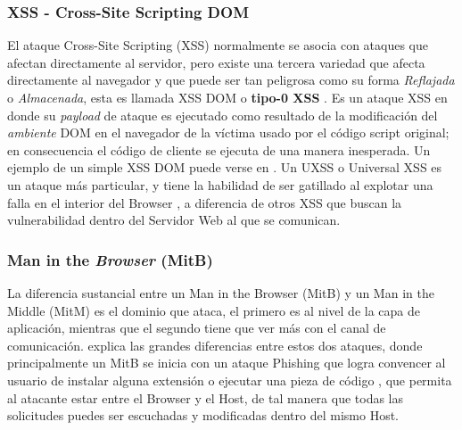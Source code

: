 	\subsubsection{XSS - Cross-Site Scripting DOM}
	El ataque Cross-Site Scripting (XSS) normalmente se asocia con ataques que afectan directamente al servidor, pero existe una tercera variedad que afecta directamente al navegador \cite{Singh2014} y que puede ser tan peligrosa como su forma \textit{Reflajada} o \textit{Almacenada}, esta es llamada XSS DOM o \textbf{tipo-0 XSS} \cite{XSSDOMOwasp, XSSDOM}. Es un ataque XSS en donde su \textit{payload} de ataque es ejecutado como resultado de la modificación del \textit{ambiente} DOM en el navegador de la víctima usado por el código script original; en consecuencia el código de cliente se ejecuta de una manera inesperada. Un ejemplo de un simple XSS DOM puede verse en \cite{bugzillaXSSDOM}. Un UXSS o Universal XSS es un ataque más particular, y tiene la habilidad de ser gatillado al explotar una falla en el interior del Browser \cite{Paola2006}, a diferencia de otros XSS que buscan la vulnerabilidad dentro del Servidor Web al que se comunican.


	\subsubsection{Man in the \textit{Browser} (MitB)}
	La diferencia sustancial entre un Man in the Browser (MitB) y un Man in the Middle (MitM) es el dominio que ataca, el primero es al nivel de la capa de aplicación, mientras que el segundo tiene que ver más con el canal de comunicación. \cite{Dougan2012} explica las grandes diferencias entre estos dos ataques, donde principalmente un MitB se inicia con un ataque Phishing que logra convencer al usuario de instalar alguna extensión o ejecutar una pieza de código \cite{Utakrit2009, Paola2006}, que permita al atacante estar entre el Browser y el Host, de tal manera que todas las solicitudes puedes ser escuchadas y modificadas dentro del mismo Host.




